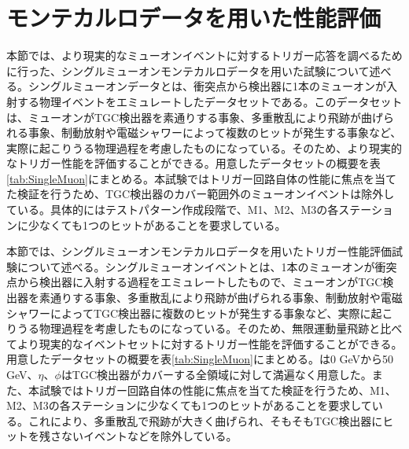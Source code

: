 \section{モンテカルロデータを用いた性能評価}
\label{sec_SingleMuon}

本節では、より現実的なミューオンイベントに対するトリガー応答を調べるために行った、シングルミューオンモンテカルロデータを用いた試験について述べる。シングルミューオンデータとは、衝突点から検出器に1本のミューオンが入射する物理イベントをエミュレートしたデータセットである。このデータセットは、ミューオンがTGC検出器を素通りする事象、多重散乱により飛跡が曲げられる事象、制動放射や電磁シャワーによって複数のヒットが発生する事象など、実際に起こりうる物理過程を考慮したものになっている。そのため、より現実的なトリガー性能を評価することができる。用意したデータセットの概要を表\ref{tab:SingleMuon}にまとめる。本試験ではトリガー回路自体の性能に焦点を当てた検証を行うため、TGC検出器のカバー範囲外のミューオンイベントは除外している。具体的にはテストパターン作成段階で、M1、M2、M3の各ステーションに少なくても1つのヒットがあることを要求している。

本節では、シングルミューオンモンテカルロデータを用いたトリガー性能評価試験について述べる。シングルミューオンイベントとは、1本のミューオンが衝突点から検出器に入射する過程をエミュレートしたもので、ミューオンがTGC検出器を素通りする事象、多重散乱により飛跡が曲げられる事象、制動放射や電磁シャワーによってTGC検出器に複数のヒットが発生する事象など、実際に起こりうる物理過程を考慮したものになっている。そのため、無限運動量飛跡と比べてより現実的なイベントセットに対するトリガー性能を評価することができる。用意したデータセットの概要を表\ref{tab:SingleMuon}にまとめる。\pt は0 GeVから50 GeV、$\eta$、$\phi$はTGC検出器がカバーする全領域に対して満遍なく用意した。また、本試験ではトリガー回路自体の性能に焦点を当てた検証を行うため、M1、M2、M3の各ステーションに少なくても1つのヒットがあることを要求している。これにより、多重散乱で飛跡が大きく曲げられ、そもそもTGC検出器にヒットを残さないイベントなどを除外している。

